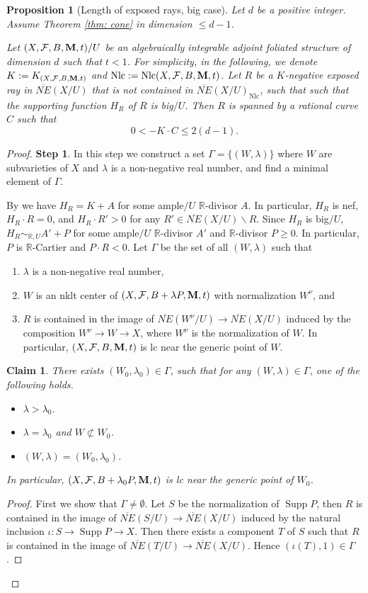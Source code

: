 \documentclass[12pt]{amsart}
\numberwithin{equation}{section}
\newcommand{\Mm}{{\bf{M}}}
\newcommand{\Rr}{\mathbb{R}}
\newcommand{\Supp}{\operatorname{Supp}}
\newcommand{\Nlc}{\operatorname{Nlc}}
\newcommand{\Ff}{\mathcal{F}}
\newcommand{\Ii}{\Gamma}
\newtheorem{prop}[thm]{Proposition}
\newtheorem{claim}[thm]{Claim}
\theoremstyle{definition}
\theoremstyle{definition}
\theoremstyle{definition}
\begin{document}
\begin{prop}[Length of exposed rays, big case]\label{prop: cone big case}
Let $d$ be a positive integer. Assume Theorem \ref{thm: cone} in dimension $\leq d-1$.

Let $(X,\Ff,B,\Mm,t)/U$ be an algebraically integrable adjoint foliated structure of dimension $d$ such that $t<1$. For simplicity, in the following, we denote $K:=K_{(X,\Ff,B,\Mm,t)}$ and $\Nlc:=\Nlc(X,\Ff,B,\Mm,t)$. Let $R$ be a $K$-negative exposed ray in $\overline{NE}(X/U)$ that is not contained in $\overline{NE}(X/U)_{\Nlc}$, such that such that the supporting function $H_R$ of $R$ is big$/U$. Then $R$ is spanned by a rational curve $C$ such that
$$0<-K\cdot C\leq 2(d-1).$$
\end{prop}
\begin{proof}
\noindent\textbf{Step 1}. In this step we construct a set $\Ii=\{(W,\lambda)\}$ where $W$ are subvarieties of $X$ and $\lambda$ is a non-negative real number, and find a minimal element of $\Ii$.

By \cite[Lemma 8.4.1]{CHLX23} we have $H_R=K+A$ for some ample$/U$ $\Rr$-divisor $A$. In particular, $H_R$ is nef, $H_R\cdot R=0$, and $H_R\cdot R'>0$ for any $R'\in\overline{NE}(X/U)\backslash R$. Since $H_R$ is big$/U$, $H_R\sim_{\mathbb R,U}A'+P$ for some ample$/U$ $\Rr$-divisor $A'$ and $\Rr$-divisor $P\geq 0$. In particular, $P$ is $\Rr$-Cartier and $P\cdot R<0$. Let $\Ii$ be the set of all $(W,\lambda)$ such that
\begin{enumerate}
    \item $\lambda$ is a non-negative real number,
    \item $W$ is an nklt center of $(X,\Ff,B+\lambda P,\Mm,t)$ with normalization $W^\nu$, and
    \item $R$ is contained in the image of $\overline{NE}(W^\nu/U)\rightarrow\overline{NE}(X/U)$ induced by the composition $W^\nu\rightarrow W\rightarrow X$, where $W^\nu$ is the normalization of $W$. In particular, $(X,\Ff,B,\Mm,t)$ is lc near the generic point of $W$. 
\end{enumerate}
\begin{claim}\label{claim: existence of minimal (W,lambda)}
There exists $(W_0,\lambda_0)\in\Ii$, such that for any $(W,\lambda)\in\Ii$, one of the following holds.
\begin{itemize}
\item $\lambda>\lambda_0$.
\item $\lambda=\lambda_0$ and $W\not\subset W_0$.
\item $(W,\lambda)=(W_0,\lambda_0)$.
\end{itemize}
In particular, $(X,\Ff,B+\lambda_0P,\Mm,t)$ is lc near the generic point of $W_0$.
\end{claim}
\begin{proof}
    First we show that $\Ii\not=\emptyset$. Let $S$ be the normalization of $\Supp P$, then $R$ is contained in the image of $\overline{NE}(S/U)\rightarrow\overline{NE}(X/U)$ induced by the natural inclusion $\iota:S\rightarrow \Supp P\rightarrow X.$ Then there exists a component $T$ of $S$ such that $R$ is contained in the image of $\overline{NE}(T/U)\rightarrow\overline{NE}(X/U)$. Hence $(\iota(T),1)\in\Ii$.


\end{proof}
\end{proof}
\end{document}
